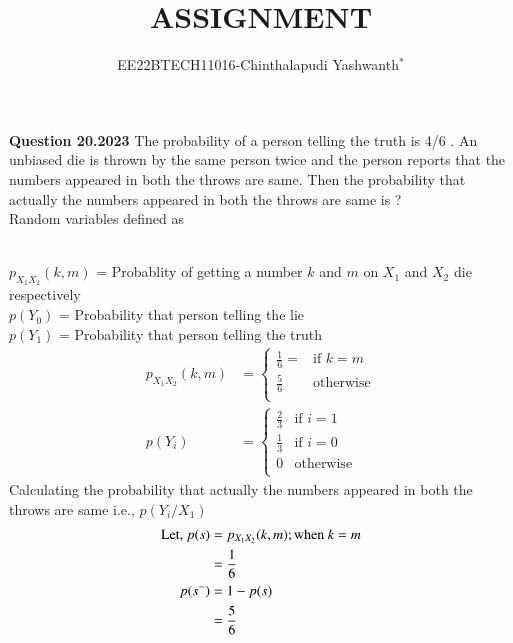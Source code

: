 \documentclass[journal,12pt,twocolumn]{IEEEtran}
\theoremstyle{remark}
\begin{document}

\vspace{3cm}

\title{ASSIGNMENT}
\author{EE22BTECH11016-Chinthalapudi Yashwanth$^{*}$%
}
\maketitle
\newpage
\bigskip
\renewcommand{\thefigure}{\theenumi}
\renewcommand{\thetable}{\theenumi}

\textbf{Question 20.2023}
The probability of a person telling the truth is 4/6 . An unbiased die is thrown by
the same person twice and the person reports that the numbers appeared in both
the throws are same. Then the probability that actually the numbers appeared in
both the throws are same is ?\\
\solution
Random variables defined as
\begin{table}[!ht]
	
\end{table}\\
$p_{X_{1}X_{2}}(k,m)$ = Probablity of getting a number $k$ and $m$ on $X_1$ and $X_2$ die respectively\\
$p(Y_0)$ = Probability that person telling the lie\\
$p(Y_1)$ = Probability that person telling the truth\\
\begin{align}
p_{X_{1}X_{2}}(k,m)&=\begin{cases}
            \frac{1}{6} = & \text{if } k = m\\
            \frac{5}{6} & \text{otherwise}\\
        \end{cases}\\
p(Y_i) &= \begin{cases}
	    \frac{2}{3} & \text{if } i = 1\\
	    \frac{1}{3} & \text{if } i = 0\\
	    0 & \text{otherwise}\\
          \end{cases}
\end{align}
Calculating the probability that actually the numbers appeared in
both the throws are same i.e., $p(Y_i / X_1)$
\begin{align}
\text{Let, } p(s) &= p_{X_{1}X_{2}}(k,m) ;\text{when } k=m \notag \\
                  &= \frac{1}{6}\\
             p(s^-) &= 1 - p(s) \notag \\
                    &= \frac{5}{6}
\end{align}
\end{document}
